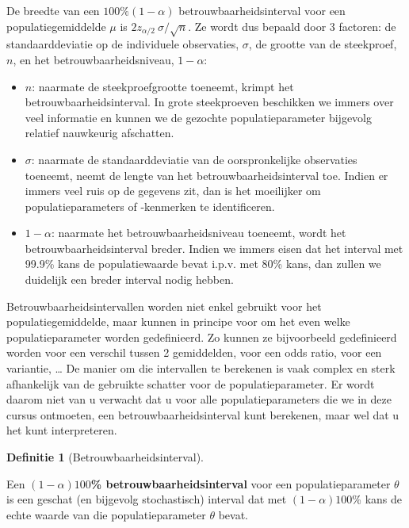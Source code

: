 \documentclass[
  12pt,dutch,coursenotes]{book}
\theoremstyle{definition}
\newtheorem{definition}{Definitie}[chapter]
\theoremstyle{definition}
\theoremstyle{definition}
\theoremstyle{remark}
\begin{document}
De breedte van een \(100\%(1-\alpha)\) betrouwbaarheidsinterval voor een
populatiegemiddelde \(\mu\) is \(2 z_{\alpha/2} \ \sigma/\sqrt{n}\). Ze wordt
dus bepaald door 3 factoren: de standaarddeviatie op de individuele
observaties, \(\sigma\), de grootte van de steekproef, \(n\), en het
betrouwbaarheidsniveau, \(1-\alpha\):

\begin{itemize}
\item
  \(n\): naarmate de steekproefgrootte toeneemt, krimpt het
  betrouwbaarheidsinterval. In grote steekproeven beschikken we immers over veel informatie en kunnen we de gezochte populatieparameter bijgevolg relatief nauwkeurig afschatten.
\item
  \(\sigma\): naarmate de standaarddeviatie van de oorspronkelijke
  observaties toeneemt, neemt de lengte van het betrouwbaarheidsinterval toe. Indien er immers veel ruis op de gegevens zit, dan is het moeilijker om populatieparameters of -kenmerken te identificeren.
\item
  \(1-\alpha\): naarmate het betrouwbaarheidsniveau toeneemt, wordt het
  betrouwbaarheidsinterval breder. Indien we immers eisen dat het interval met 99.9\% kans de populatiewaarde bevat i.p.v. met 80\% kans, dan zullen we duidelijk een breder interval nodig hebben.
\end{itemize}

Betrouwbaarheidsintervallen worden niet enkel gebruikt voor het
populatiegemiddelde, maar kunnen in principe voor om het even welke
populatieparameter worden gedefinieerd. Zo kunnen ze bijvoorbeeld
gedefinieerd worden voor een verschil tussen 2 gemiddelden, voor een odds ratio, voor een variantie, \ldots{} De manier om die
intervallen te berekenen is vaak complex en sterk afhankelijk van de
gebruikte schatter voor de populatieparameter. Er wordt daarom niet van u
verwacht dat u voor alle populatieparameters die we in deze cursus
ontmoeten, een betrouwbaarheidsinterval kunt berekenen, maar wel dat u het
kunt interpreteren.

\begin{definition}[Betrouwbaarheidsinterval]
\protect\hypertarget{def:unnamed-chunk-149}{}{\label{def:unnamed-chunk-149} \iffalse (Betrouwbaarheidsinterval) \fi{} }
\end{definition}
Een \textbf{\((1-\alpha)100\)\% betrouwbaarheidsinterval} voor een populatieparameter \(\theta\) is een
geschat (en bijgevolg stochastisch) interval dat met \((1-\alpha)100\)\% kans
de echte waarde van die populatieparameter \(\theta\) bevat.
\end{document}
